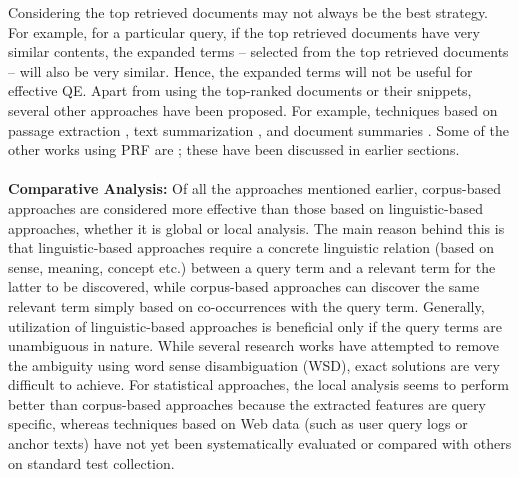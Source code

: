 Considering the top retrieved documents may not always be the best strategy. For example, for a particular query, if the top retrieved documents have very similar contents, the expanded terms -- selected from the top retrieved documents -- will also be very similar. Hence, the expanded terms will not be useful for effective QE. Apart from using the top-ranked documents or their snippets, several other approaches have been proposed. For example, techniques based on passage extraction \cite{xu1996query},  text summarization  \cite{lam2001applying}, and  document summaries \cite{chang2006query}. Some of the other works using PRF are  \cite{cao2008selecting,xu2009query,lv2010positional}; these have been discussed in earlier sections.\\\\
\textbf{Comparative Analysis:} Of all the approaches mentioned earlier, corpus-based approaches are considered more effective than those based on linguistic-based approaches, whether it is global or local analysis. The main reason behind this is that linguistic-based approaches require a concrete linguistic relation (based on sense, meaning, concept etc.) between a query term and a relevant term for the latter to be discovered, while corpus-based approaches can discover the same relevant term simply based on co-occurrences with the query term. Generally, utilization of linguistic-based approaches is beneficial only if the query terms are unambiguous in nature. While several research works have attempted to remove the ambiguity using word sense disambiguation (WSD), exact solutions are very difficult to achieve. For statistical approaches, the local analysis seems to perform better than corpus-based approaches because the extracted features are query specific, whereas techniques based on Web data (such as user query logs or anchor texts) have not yet been systematically evaluated or compared with others on standard test collection. 


